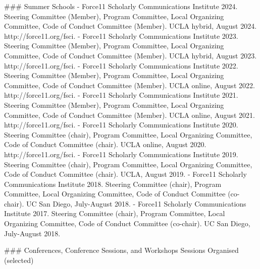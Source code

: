 \sectionbreak{}
### Summer Schools
- Force11 Scholarly Communications Institute 2024. Steering Committee (Member), Program Committee, Local Organizing Committee, Code of Conduct Committee (Member). UCLA hybrid, August 2024. http:/\allowbreak{}/\allowbreak{}force11.org/\allowbreak{}fsci.
- Force11 Scholarly Communications Institute 2023. Steering Committee (Member), Program Committee, Local Organizing Committee, Code of Conduct Committee (Member). UCLA hybrid, August 2023. http:/\allowbreak{}/\allowbreak{}force11.org/\allowbreak{}fsci.
- Force11 Scholarly Communications Institute 2022. Steering Committee (Member), Program Committee, Local Organizing Committee, Code of Conduct Committee (Member). UCLA online, August 2022. http:/\allowbreak{}/\allowbreak{}force11.org/\allowbreak{}fsci.
- Force11 Scholarly Communications Institute 2021. Steering Committee (Member), Program Committee, Local Organizing Committee, Code of Conduct Committee (Member). UCLA online, August 2021. http:/\allowbreak{}/\allowbreak{}force11.org/\allowbreak{}fsci.
- Force11 Scholarly Communications Institute 2020. Steering Committee (chair), Program Committee, Local Organizing Committee, Code of Conduct Committee (chair). UCLA online, August 2020. http:/\allowbreak{}/\allowbreak{}force11.org/\allowbreak{}fsci.
- Force11 Scholarly Communications Institute 2019. Steering Committee (chair), Program Committee, Local Organizing Committee, Code of Conduct Committee (chair). UCLA, August 2019.
- Force11 Scholarly Communications Institute 2018. Steering Committee (chair), Program Committee, Local Organizing Committee, Code of Conduct Committee (co-chair). UC San Diego, July-August 2018.
- Force11 Scholarly Communications Institute 2017. Steering Committee (chair), Program Committee, Local Organizing Committee, Code of Conduct Committee (co-chair). UC San Diego, July-August 2018.

\sectionbreak{}
### Conferences, Conference Sessions, and Workshops Sessions Organised (selected)

